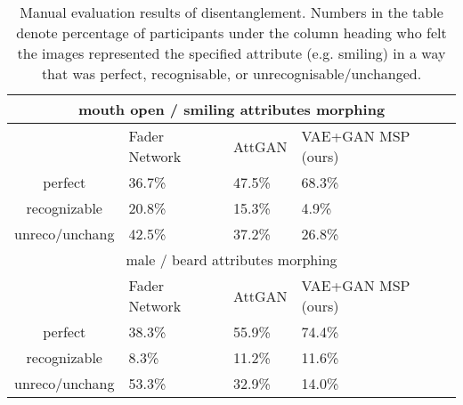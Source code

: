 \documentclass{article}
\begin{document}
\begin{table}[htb]
  \caption{Quantitative evaluation  of disentanglement (using  ResNet-CNN classifier).}
  \label{T:entan}
\end{table}
\begin{table}[tb]
\begin{center}
\begin{tabular}{|c|p{1.3cm}|p{1.2cm}|p{1.7cm}|}
\hline
\multicolumn{4}{|c|}{mouth open / smiling attributes morphing}  \\ \hline
	&	Fader Network 	&	AttGAN	&		VAE+GAN MSP	(ours)\\ \hline
perfect	&	36.7\%&	47.5\%	&		68.3\%	\\ \hline
recognizable	&	20.8\%&	15.3\%	&	4.9\%	\\ \hline
unreco/unchang	&	42.5\%&	37.2\%	&	26.8\%	\\ \hline \hline
\multicolumn{4}{|c|}{male / beard attributes morphing}  \\ \hline
	&	Fader Network	&	AttGAN	&	VAE+GAN MSP	(ours)\\ \hline
perfect	&	38.3\%	&	55.9\%	&		74.4\%	\\ \hline
recognizable	&	8.3\%&	11.2\%	&		11.6\%	\\ \hline
unreco/unchang	&	53.3\%& 32.9\%	&	14.0\%	\\ \hline
\end{tabular}
\end{center}
\caption{Manual evaluation results of disentanglement. Numbers in the table denote percentage of participants under the column heading who felt the images represented the specified attribute (e.g. smiling) in a way that was perfect, recognisable, or unrecognisable/unchanged.}
\small
\label{tab:evalu2}
\end{table}
\end{document}
